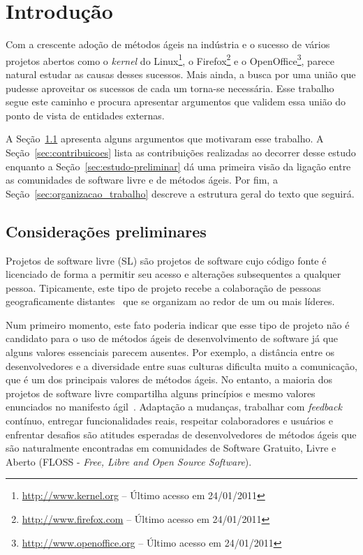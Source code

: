 \chapter{Introdução}
\label{cap:introducao}

Com a crescente adoção de métodos ágeis na indústria e o sucesso de
vários projetos abertos como o \textit{kernel} do
Linux\footnote{\url{http://www.kernel.org} -- Último acesso em
  24/01/2011}, o Firefox\footnote{\url{http://www.firefox.com} --
  Último acesso em 24/01/2011} e o
OpenOffice\footnote{\url{http://www.openoffice.org} -- Último acesso
  em 24/01/2011}, parece natural estudar as causas desses
sucessos. Mais ainda, a busca por uma união que pudesse aproveitar os
sucessos de cada um torna-se necessária. Esse trabalho segue este
caminho e procura apresentar argumentos que validem essa união do
ponto de vista de entidades externas.

A Seção~\ref{sec:consideracoes_preliminares} apresenta alguns
argumentos que motivaram esse trabalho. A
Seção~\ref{sec:contribuicoes} lista as contribuições realizadas ao
decorrer desse estudo enquanto a Seção~\ref{sec:estudo-preliminar} dá
uma primeira visão da ligação entre as comunidades de software livre e
de métodos ágeis. Por fim, a Seção~\ref{sec:organizacao_trabalho}
descreve a estrutura geral do texto que seguirá.

\section{Considerações preliminares}
\label{sec:consideracoes_preliminares}

Projetos de software livre (SL) são projetos de software cujo código
fonte é licenciado de forma a permitir seu acesso e alterações
subsequentes a qualquer pessoa. Tipicamente, este tipo de projeto
recebe a colaboração de pessoas geograficamente
distantes~\cite{Dempsey1999} que se organizam ao redor de um ou mais
líderes.

Num primeiro momento, este fato poderia indicar que esse tipo de
projeto não é candidato para o uso de métodos ágeis de desenvolvimento
de software já que alguns valores essenciais parecem ausentes. Por
exemplo, a distância entre os desenvolvedores e a diversidade entre
suas culturas dificulta muito a comunicação, que é um dos principais
valores de métodos ágeis. No entanto, a maioria dos projetos de
software livre compartilha alguns princípios e mesmo valores
enunciados no manifesto ágil~\cite{AgileManifesto}. Adaptação a
mudanças, trabalhar com \emph{feedback} contínuo, entregar
funcionalidades reais, respeitar colaboradores e usuários e enfrentar
desafios são atitudes esperadas de desenvolvedores de métodos ágeis
que são naturalmente encontradas em comunidades de Software Gratuito,
Livre e Aberto (FLOSS - \emph{Free, Libre and Open Source Software}).

